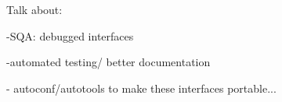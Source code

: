 \documentclass[acmtocl]{acmtrans2m}
\begin{document}
\bigskip

Talk about:

-SQA: debugged interfaces

-automated testing/ better documentation

- autoconf/autotools to make these interfaces portable...



\end{document}
